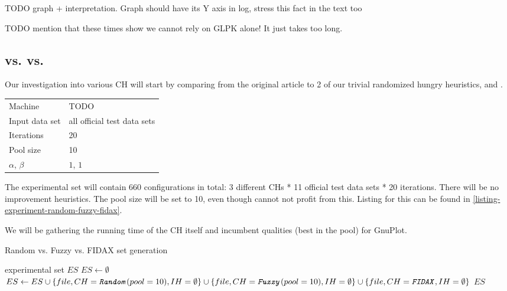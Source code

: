 TODO graph + interpretation. Graph should have its Y axis in log, stress this fact in the text too

TODO mention that these times show we cannot rely on GLPK alone! It just takes too long.

\subsection{ vs.  vs. }


Our investigation into various CH will start by comparing  from the original article \cite{fidax} to 2 of our trivial randomized hungry heuristics,  and .

\begin{center}
\bigskip
\begin{tabular}{| l | l |}
  \hline
  \hline
  Machine           & TODO \\
  Input data set    & all official test data sets \\
  Iterations        & 20 \\
  Pool size         & 10 \\
  $\alpha$, $\beta$ & $1$, $1$ \\
  \hline
\end{tabular}
\bigskip
\end{center}

The experimental set will contain 660 configurations in total: 3 different CHs * 11 official test data sets * 20 iterations. There will be no improvement heuristics. The pool size will be set to 10, even though  cannot not profit from this. Listing for this can be found in \ref{listing-experiment-random-fuzzy-fidax}.

We will be gathering the running time of the CH itself and incumbent qualities (best in the pool) for GnuPlot.

\begin{algorithm}
\caption{Random vs. Fuzzy vs. FIDAX set generation}
\label{listing-experiment-random-fuzzy-fidax}
\begin{algorithmic}
\ENSURE experimental set $ES$
\STATE $ES \gets \emptyset$
    \STATE $ES \gets ES \cup \{file, CH = \texttt{\textit{Random}}(pool = 10), IH = \emptyset\} \cup \{file, CH = \texttt{\textit{Fuzzy}}(pool = 10), IH = \emptyset\} \cup \{file, CH = \texttt{\textit{FIDAX}}, IH = \emptyset\}$
  \ENDFOR
\ENDFOR
\RETURN $ES$
\end{algorithmic}
\end{algorithm}

